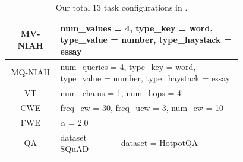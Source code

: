 \begin{table}[H]
{\begin{tabular}{c|p{0.26\linewidth}|p{0.26\linewidth}|p{0.26\linewidth}}
\\
\midrule
MV-NIAH & 
\multicolumn{3}{l}{num\_values = 4, type\_key = word, type\_value = number, type\_haystack = essay}
\\
\midrule
MQ-NIAH & 
\multicolumn{3}{l}{num\_queries = 4, type\_key = word, type\_value = number, type\_haystack = essay}
\\
\midrule
VT & 
\multicolumn{3}{l}{num\_chains = 1, num\_hops = 4}
\\
\midrule
CWE & 
\multicolumn{3}{l}{freq\_cw = 30, freq\_ucw = 3, num\_cw = 10}
\\
\midrule
FWE & 
\multicolumn{3}{l}{$\alpha$ = 2.0}
\\
\midrule
QA & 
dataset = SQuAD & 
\multicolumn{2}{l}{dataset = HotpotQA}
\\
\bottomrule
\end{tabular}}
\caption{Our total 13 task configurations in .}
\label{tab:benchmark-task}
\end{table}